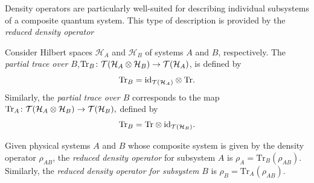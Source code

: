 Density operators are particularly well-suited for describing individual subsystems of a composite quantum system. This type of description is provided by the \emph{reduced density operator}

\begin{definition}
Consider Hilbert spaces $\mathcal{H}_A$ and $\mathcal{H}_B$ of systems $A$ and $B$, respectively. The \emph{partial trace over $B$},$\text{Tr}_B \colon \mathcal{T}(\mathcal{H}_A \otimes \mathcal{H}_B) \to \mathcal{T}(\mathcal{H}_A)$,
is defined by
\[
\text{Tr}_B = \text{id}_{\mathcal{T}(\mathcal{H}_A)} \otimes \text{Tr}.
\]
Similarly, the \emph{partial trace over $B$} corresponds to the map \(
\text{Tr}_A \colon \mathcal{T}(\mathcal{H}_A \otimes \mathcal{H}_B) \to \mathcal{T}(\mathcal{H}_B),
\)
defined by 
\[
\text{Tr}_B = \text{Tr} \otimes \text{id}_{\mathcal{T}(\mathcal{H}_B)}.
\]
\end{definition}

\begin{definition}
Given physical systems $A$ and $B$ whose composite system is given by the density operator $\rho_{AB}$, the \emph{reduced density operator} for subsystem $A$ is $\rho_{A} = \text{Tr}_{B}(\rho_{AB}).$
Similarly, the \emph{reduced density operator for subsystem} $B$ is $\rho_{B} = \text{Tr}_{A}(\rho_{AB})$.
\end{definition}

